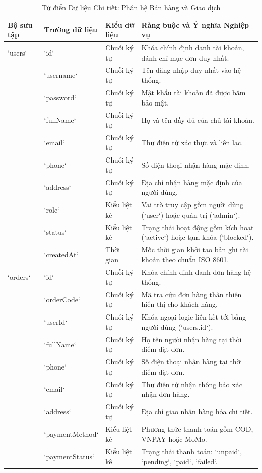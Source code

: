 \begin{table}[H]
\centering
\caption{Từ điển Dữ liệu Chi tiết: Phân hệ Bán hàng và Giao dịch}
\label{tab:dict_commerce}
\begin{tabularx}{\textwidth}{p{2.5cm}p{2.3cm}p{1.8cm}X}
\toprule
\textbf{Bộ sưu tập} & \textbf{Trường dữ liệu} & \textbf{Kiểu dữ liệu} & \textbf{Ràng buộc và Ý nghĩa Nghiệp vụ} \\
\midrule
`users` & `id` & Chuỗi ký tự & Khóa chính định danh tài khoản, đánh chỉ mục đơn duy nhất. \\
& `username` & Chuỗi ký tự & Tên đăng nhập duy nhất vào hệ thống. \\
& `password` & Chuỗi ký tự & Mật khẩu tài khoản đã được băm bảo mật. \\
& `fullName` & Chuỗi ký tự & Họ và tên đầy đủ của chủ tài khoản. \\
& `email` & Chuỗi ký tự & Thư điện tử xác thực và liên lạc. \\
& `phone` & Chuỗi ký tự & Số điện thoại nhận hàng mặc định. \\
& `address` & Chuỗi ký tự & Địa chỉ nhận hàng mặc định của người dùng. \\
& `role` & Kiểu liệt kê & Vai trò truy cập gồm người dùng (`user`) hoặc quản trị (`admin`). \\
& `status` & Kiểu liệt kê & Trạng thái hoạt động gồm kích hoạt (`active`) hoặc tạm khóa (`blocked`). \\
& `createdAt` & Thời gian & Mốc thời gian khởi tạo bản ghi tài khoản theo chuẩn ISO 8601. \\
\addlinespace
`orders` & `id` & Chuỗi ký tự & Khóa chính định danh đơn hàng hệ thống. \\
& `orderCode` & Chuỗi ký tự & Mã tra cứu đơn hàng thân thiện hiển thị cho khách hàng. \\
& `userId` & Chuỗi ký tự & Khóa ngoại logic liên kết tới bảng người dùng (`users.id`). \\
& `fullName` & Chuỗi ký tự & Họ tên người nhận hàng tại thời điểm đặt đơn. \\
& `phone` & Chuỗi ký tự & Số điện thoại nhận hàng tại thời điểm đặt đơn. \\
& `email` & Chuỗi ký tự & Thư điện tử nhận thông báo xác nhận đơn hàng. \\
& `address` & Chuỗi ký tự & Địa chỉ giao nhận hàng hóa chi tiết. \\
& `paymentMethod` & Kiểu liệt kê & Phương thức thanh toán gồm COD, VNPAY hoặc MoMo. \\
& `paymentStatus` & Kiểu liệt kê & Trạng thái thanh toán: `unpaid`, `pending`, `paid`, `failed`. \\

\end{tabularx}
\end{table}
